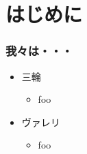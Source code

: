 \section{はじめに}
\begin{frame}
    \frametitle{我々は・・・}
    \begin{itemize}
        \item<4-> 三輪
        \begin{itemize}
            \item<5-> foo
        \end{itemize}
        \item<6-> ヴァレリ
        \begin{itemize}
            \item<7-> foo
        \end{itemize}
    \end{itemize}
\end{frame}